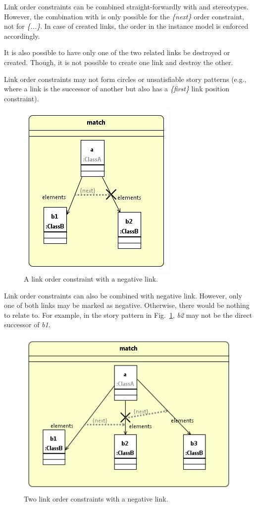 Link order constraints can be combined straight-forwardly with \create and \destroy stereotypes. However, the combination with \create is only possible for the \emph{\{next\}} order constraint, not for \emph{\{...\}}. In case of created links, the order in the instance model is enforced accordingly.


It is also possible to have only one of the two related links be destroyed or created. Though, it is not possible to create one link and destroy the other.

Link order constraints may not form circles or unsatisfiable story patterns (e.g., where a link is the successor of another but also has a \emph{\{first\}} link position constraint).

\begin{figure}
\center
\includegraphics[width=0.4\columnwidth]{figures/linkOrderConstraint2.png}
\caption{A link order constraint with a negative link.}
\label{fig:linkOrderConstraints:linkOrderConstaint2}
\end{figure}

Link order constraints can also be combined with negative link. However, only one of both links may be marked as negative. Otherwise, there would be nothing to relate to. For example, in the story pattern in Fig.~\ref{fig:linkOrderConstraints:linkOrderConstaint2}, \emph{b2} may not be the direct successor of \emph{b1}.

\begin{figure}
\center
\includegraphics[width=0.6\columnwidth]{figures/linkOrderConstraint3.png}
\caption{Two link order constraints with a negative link.}
\label{fig:linkOrderConstraints:linkOrderConstaint3}
\end{figure}

